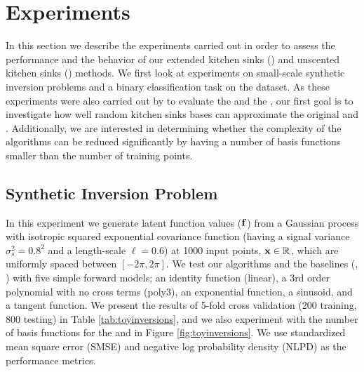 \section{Experiments}
%
In this section we describe the experiments carried out in order to assess 
the performance and the behavior of our extended kitchen sinks (\eks) and 
unscented kitchen sinks (\uks) methods. We first look at experiments on 
small-scale synthetic inversion problems and a binary classification task on 
the \usps dataset. As these experiments were also carried out by 
\citet{steinberg-bonilla-nips-2014} to evaluate the \egp and the \ugp, 
our first goal  is to investigate how well 
random kitchen sinks bases can approximate the original \egp and \ugp.
Additionally, we are interested in determining whether the complexity 
of the algorithms  can be reduced significantly by having a  number 
of basis functions smaller than the number of training points.
%
\subsection{Synthetic Inversion Problem}
In this experiment we generate latent function values ($\mathbf{f}$) from a
Gaussian process with isotropic squared exponential covariance function (having
a signal variance  $\sigma^2_s = 0.8^2$ and a length-scale $\ell = 0.6$) at
1000 input points, $\mathbf{x} \in \mathbb{R}^{}$, which are uniformly spaced between
$[-2\pi, 2\pi]$. We test our algorithms and the baselines (\ugp, \egp) with
five simple forward models; an identity function (linear), a 3rd order
polynomial with no cross terms (poly3), an exponential function, a sinusoid,
and a tangent function. We present the results of 5-fold cross validation (200
training, 800 testing) in Table \ref{tab:toyinversions}, and we also experiment
with the number of basis functions for the \eks and \uks in
Figure \ref{fig:toyinversions}. %
We use standardized mean square error (SMSE) and negative log probability density
(NLPD) as the performance metrics. 
%
\begin{table}[t]
\caption{Performance of the \eks and \uks methods compared to their GP counterparts (\egp and \ugp) on a range of synthetic benchmarks when using $D=200$ features. The mean for each measure is shown and the
standard deviation in brackets. 
\label{tab:toyinversions}
}

\begin{center}
\begin{small}

\end{small}
\end{center}
\end{table}

